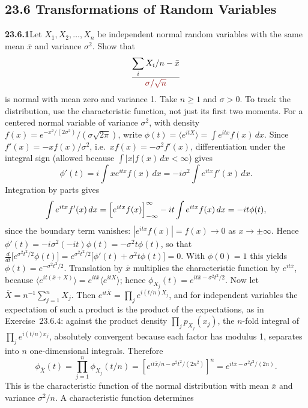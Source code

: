 \subsection*{23.6 Transformations of Random Variables}

\par\bigskip
\noindent\textbf{23.6.1}\quad Let $X_{1},X_{2},\ldots,X_{n}$ be
independent normal random variables with the same mean $\bar{x}$
and variance $\sigma^{2}$. Show that
\[
\frac{\displaystyle\sum_{i}X_{i}/n-\bar{x}}
{\erratum{\sigma/\sqrt{n}}}
\]
is normal with mean zero and variance 1.
\solution
Take $n\ge1$ and $\sigma>0$. To track the distribution, use the
characteristic function, not just its first two moments. For a centered
normal variable of variance $\sigma^2$, with density
$f(x)=e^{-x^2/(2\sigma^2)}/(\sigma\sqrt{2\pi})$, write
$\phi(t)=\langle e^{itX}\rangle=\int e^{itx}f(x)\,dx$.
Since $f'(x)=-xf(x)/\sigma^2$, i.e.\ $xf(x)=-\sigma^2f'(x)$,
differentiation under the integral sign (allowed because
$\int|x|f(x)\,dx<\infty$) gives
\[
\phi'(t)=i\int xe^{itx}f(x)\,dx
=-i\sigma^2\int e^{itx}f'(x)\,dx.
\]
Integration by parts gives
\[
\int e^{itx}f'(x)\,dx
=\Bigl[e^{itx}f(x)\Bigr]_{-\infty}^{\infty}-it\int e^{itx}f(x)\,dx
=-it\phi(t),
\]
since the boundary term vanishes: $|e^{itx}f(x)|=f(x)\to0$ as
$x\to\pm\infty$. Hence $\phi'(t)=-i\sigma^2(-it)\phi(t)=-\sigma^2t\phi(t)$,
so that
$\frac d{dt}\bigl[e^{\sigma^2t^2/2}\phi(t)\bigr]
=e^{\sigma^2t^2/2}\bigl[\phi'(t)+\sigma^2t\phi(t)\bigr]=0$.
With $\phi(0)=1$ this yields $\phi(t)=e^{-\sigma^2t^2/2}$.
Translation by $\bar x$ multiplies the characteristic function by
$e^{it\bar x}$, because $\langle e^{it(\bar x+X)}\rangle
=e^{it\bar x}\langle e^{itX}\rangle$; hence
$\phi_{X_j}(t)=e^{it\bar x-\sigma^2t^2/2}$.
Now let $\overline X=n^{-1}\sum_{j=1}^nX_j$. Then
$e^{it\overline X}=\prod_je^{i(t/n)X_j}$, and for independent
variables the expectation of such a product is the product of the
expectations, as in Exercise~23.6.4: against the product density
$\prod_jp_{X_j}(x_j)$, the $n$-fold integral of
$\prod_je^{i(t/n)x_j}$, absolutely convergent because each factor has
modulus 1, separates into $n$ one-dimensional integrals. Therefore
\[
\phi_{\overline X}(t)
=\prod_{j=1}^n\phi_{X_j}(t/n)
=\left[e^{it\bar x/n-\sigma^2t^2/(2n^2)}\right]^n
=e^{it\bar x-\sigma^2t^2/(2n)}.
\]
This is the characteristic function of the normal distribution with mean
$\bar x$ and variance $\sigma^2/n$. A characteristic function determines
